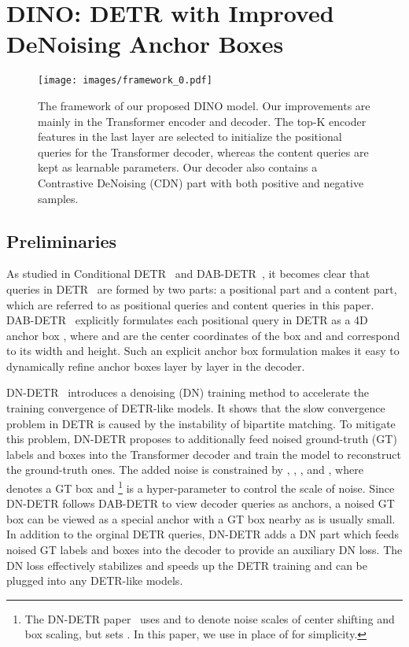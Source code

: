 \documentclass[runningheads]{llncs}
\newcommand{\modelname}{{DINO}}
\begin{document}
\section{\modelname: {D}ETR with {I}mproved De{N}oising Anchor Boxes}
\label{sec:method}
\begin{figure}[h]
\texttt{[image: images/framework\_0.pdf]}
    \centering
    \vspace{-0.5cm}
    \caption{The framework of our proposed DINO model. Our improvements are mainly in the Transformer encoder and decoder. The top-K encoder features in the last layer are selected to initialize the positional queries for the Transformer decoder, whereas the content queries are kept as learnable parameters. Our decoder also contains a Contrastive DeNoising (CDN) part with both positive and negative samples. }
    \label{fig:framework}
\end{figure} \subsection{Preliminaries}\label{sec:preliminary}
As studied in Conditional DETR~\cite{meng2021conditional} and DAB-DETR~\cite{liu2022dab}, it becomes clear that queries in DETR~\cite{carion2020end} are formed by two parts: a positional part and a content part, which are referred to as positional queries and content queries in this paper. 
DAB-DETR~\cite{liu2022dab} explicitly formulates each positional query in DETR as a 4D anchor box , where  and  are the center coordinates of the box and  and  correspond to its width and height. Such an explicit anchor box formulation makes it easy to dynamically refine anchor boxes layer by layer in the decoder.

DN-DETR~\cite{li2022dn} introduces a denoising (DN) training method to accelerate the training convergence of DETR-like models. It shows that the slow convergence problem in DETR is caused by the instability of bipartite matching. To mitigate this problem, DN-DETR proposes to additionally feed noised ground-truth (GT) labels and boxes into the Transformer decoder and train the model to reconstruct the ground-truth ones. The added noise  is constrained by , , , and , where  denotes a GT box and \footnote{The DN-DETR paper~\cite{li2022dn} uses  and  to denote noise scales of center shifting and box scaling, but sets . In this paper, we use  in place of  for simplicity.} is a hyper-parameter to control the scale of noise. Since DN-DETR follows DAB-DETR to view decoder queries as anchors, a noised GT box can be viewed as a special anchor with a GT box nearby as  is usually small. In addition to the orginal DETR queries, DN-DETR adds a DN part which feeds noised GT labels and boxes into the decoder to provide an auxiliary DN loss. The DN loss effectively stabilizes and speeds up the DETR training and can be plugged into any DETR-like models. 
\end{document}
